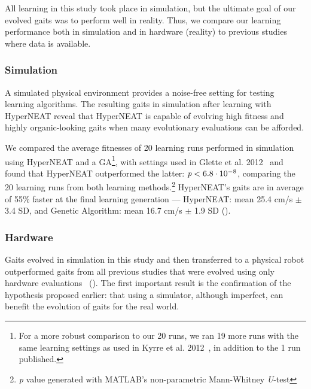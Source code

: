 
All learning in this study took place in simulation, but the ultimate
goal of our evolved gaits was to perform well in reality. Thus, we
compare our learning performance both in simulation and in hardware
(reality) to previous studies where data is available.

\subsubsection{Simulation}

A simulated physical environment provides a noise-free setting for
testing learning algorithms. The resulting gaits in simulation after
learning with HyperNEAT reveal that HyperNEAT is capable of evolving
high fitness and highly organic-looking gaits when many evolutionary
evaluations can be afforded. 

We compared the average fitnesses of 20 learning runs performed in
simulation using HyperNEAT and a GA\footnote{For a more
robust comparison to our 20 runs, we ran 19 more runs with the same
learning settings as used in Kyrre et al. 2012~\cite{glette}, in
addition to the 1 run published.}, with settings used in Glette et
al. 2012~\cite{glette} and found that HyperNEAT outperformed the
latter: $\emph{p} < 6.8\cdot10^{-8}$, comparing the
20 learning runs from both learning methods.\footnote{\emph{p} value generated
with MATLAB's non-parametric Mann-Whitney \emph{U}-test} 
HyperNEAT's gaits are in average of
55\% faster at the final learning generation --- HyperNEAT: mean 25.4
cm/s $\pm$ 3.4 SD, and Genetic Algorithm: mean 16.7 cm/s $\pm$ 1.9 SD
().


\subsubsection{Hardware}

Gaits evolved in simulation in this study and then transferred to a
physical robot outperformed gaits from all previous studies that were
evolved using only hardware evaluations~\cite{yos:clune,haocheng}
(). The first important result is the confirmation of
the hypothesis proposed earlier: that using a simulator, although
imperfect, can benefit the evolution of gaits for the real world.

